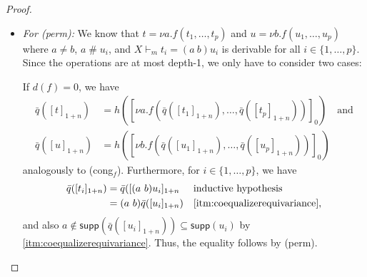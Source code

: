 \documentclass[a4paper,UKenglish,cleveref,thm-restate,numberwithinsect,final]{lipics-v2021}
\newcommand{\Perm}{\mathsf{Perm}(\Names)}
\newcommand{\Term}{\mathsf{Term}}
\newcommand{\sig}{\Sigma}
\newcommand{\Names}{\mathbb{A}}
\newcommand{\fresh}{\mathbin{\#}}
\newcommand{\supp}{\mathsf{supp}}
\theoremstyle{plain}
\numberwithin{equation}{section}
\newcommand{\+}[1]{\mathcal{#1}\xspace}
\theoremstyle{definition}
\begin{document}
\begin{proof}
\begin{enumerate}[wide]
\begin{itemize}
                    If \(r\) and \(s\) are depth-1, then \(l = n\).
                    In this case, let \(\bar{\sigma}: Y \to \Term_{\sig, 0}(M_n X)\) be defined as \(\bar{\sigma}(x) = [\sigma(x)]_n\).
                    It then follows by \cref{thm:coequalizerproperties} \eqref{itm:substitutionlemmadepth1} that
                    \begin{align*}
                        \bar{q}([t]_{1 + n}) &= q([s^n_X((\tau r)\sigma)]_1) = q([(\tau r)\bar{\sigma}]_1) \quad \text{and} \\
                        \bar{q}([u]_{1 + n}) &= q([s^n_X((\tau s)\sigma)]_1) = q([(\tau s)\bar{\sigma}]_1).
                    \end{align*}
                    We can then derive \(Q \vdash_0 (\tau r)\bar{\sigma} = (\tau s)\bar{\sigma}\) by once again showing that \(\bar{\sigma}\) is derivably equivariant:
                    Let \(\pi \in \Perm\) and \(x \in Y\).
                    Then \(\pi\bar{\sigma}(x) = \pi[\sigma(x)]_n = [\pi \sigma(x)]_n = [\sigma(\pi x)]_n\) by assumption.
                \item
                    \textit{For (perm):}
                    We know that \(t = \nu a.f(t_1, \ldots, t_p)\) and \(u = \nu b.f(u_1, \ldots, u_p)\) where \(a \neq b\), \(a \fresh u_i\), and \(X \vdash_m t_i = (a\ b)u_i\) is derivable for all \(i \in \{1, \ldots, p\}\).
                    Since the operations are at most depth-1, we only have to consider two cases:

                    If \(d(f) = 0\), we have
                    \begin{align*}
                        \bar{q}([t]_{1 + n}) &= h([\nu a.f(\bar{q}([t_1]_{1 + n}), \ldots, \bar{q}([t_p]_{1 + n}))]_0) \quad \text{and} \\
                        \bar{q}([u]_{1 + n}) &= h([\nu b.f(\bar{q}([u_1]_{1 + n}), \ldots, \bar{q}([u_p]_{1 + n}))]_0)
                    \end{align*}
                    analogously to (cong$_f$).
                    Furthermore, for \(i \in \{1, \ldots, p\}\), we have
                    \begin{align*}
                        \bar{q}([t_i]_{1 + n})
                        &= \bar{q}([(a\ b)u_i]_{1 + n} && \text{inductive hypothesis} \\
                        &= (a\ b) \bar{q}([u_i]_{1 + n}) && \text{\eqref{itm:coequalizerequivariance}},
                    \end{align*}
                    and also \(a \notin \supp(\bar{q}([u_i]_{1 + n})) \subseteq \supp(u_i)\) by \eqref{itm:coequalizerequivariance}.
                    Thus, the equality follows by (perm).


\end{itemize}
\end{enumerate}
\end{proof}
\end{document}

